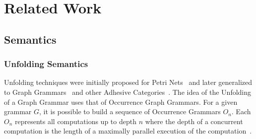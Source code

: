 \chapter{Related Work}\label{ch:related-work}

\section{Semantics}

\subsection{Unfolding Semantics}

  Unfolding techniques were initially proposed for Petri Nets~\cite{Nielsen1981} and later generalized to Graph Grammars~\cite{Ribeiro1996} and other Adhesive Categories~\cite{Baldan2009}.
  The idea of the Unfolding of a Graph Grammar uses that of Occurrence Graph Grammars. For a given grammar $G$, it is possible to build a sequence
of Occurrence Grammars $O_n$.
  Each $O_n$ represents all computations up to depth $n$ where the depth of a concurrent computation is the length of a maximally parallel execution of the computation~\cite{Baldan2009}.






